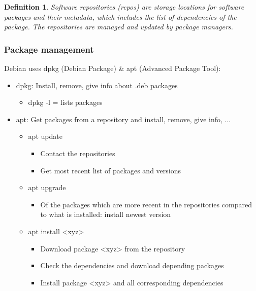\documentclass{article}
\newtheorem{theorem}{Definition}[section]
\begin{document}
\begin{theorem}
    Software repositories (repos) are storage locations for software packages and their metadata, 
    which includes the list of dependencies of the package. The repositories are managed and updated by package managers. 
\end{theorem}
   

\subsubsection{Package management}

Debian uses dpkg (Debian Package) \& apt (Advanced Package Tool):

\begin{itemize}
    \item dpkg: Install, remove, give info about .deb packages
    \begin{itemize}
        \item dpkg -l = lists packages 
    \end{itemize}
    \item apt: Get packages from a repository and install, remove, give info, ...
    \begin{itemize}
        \item apt update
        \begin{itemize}
            \item Contact the repositories
            \item Get most recent list of packages and versions
        \end{itemize}
        \item apt upgrade
        \begin{itemize}
            \item Of the packages which are more recent in the repositories compared to what is installed: install newest version
        \end{itemize}
        \item apt install <xyz>
        \begin{itemize}
            \item Download package <xyz> from the repository
            \item Check the dependencies and download depending packages
            \item Install package <xyz> and all corresponding dependencies
        \end{itemize}
    \end{itemize}
\end{itemize}
\end{document}
